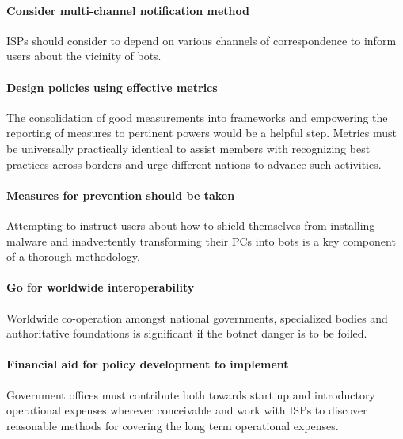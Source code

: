 \paragraph{Consider multi-channel notification method}

ISPs should consider to depend on various channels of correspondence to inform users about the vicinity of bots.

\paragraph{Design policies using effective metrics}

The consolidation of good measurements into frameworks and empowering the reporting of measures to pertinent powers would be a helpful step. Metrics must be universally practically identical to assist members with recognizing best practices across borders and urge different nations to advance such activities.

\paragraph{Measures for prevention should be taken}

Attempting to instruct users about how to shield themselves from installing malware and inadvertently transforming their PCs into bots is a key component of a thorough methodology.

\paragraph{Go for worldwide interoperability}

Worldwide co-operation amongst national governments, specialized bodies and authoritative foundations is significant if the botnet danger is to be foiled.

\paragraph{Financial aid for policy development to implement }

Government offices must contribute both towards start up and introductory operational expenses wherever conceivable and work with ISPs to discover reasonable methods for covering the long term operational expenses.


